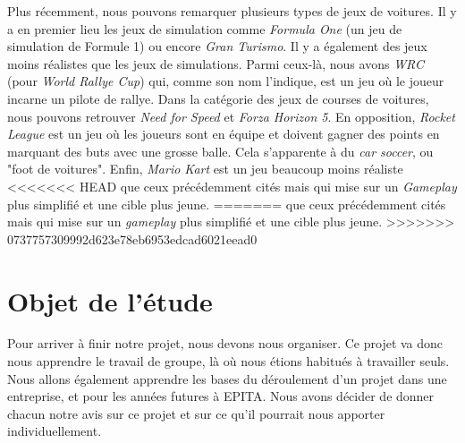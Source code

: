 \documentclass[12pt,a4paper]{article}
\begin{document}
\indent Plus récemment, nous pouvons remarquer plusieurs types de jeux de voitures. Il y a en premier lieu 
les jeux de simulation comme \textit{Formula One} (un jeu de simulation de Formule 1) ou encore 
\textit{Gran Turismo}. Il y a également des jeux moins réalistes
que les jeux de simulations. Parmi ceux-là, nous avons \textit{WRC} (pour \textit{World Rallye Cup})
qui, comme son nom l'indique, est un jeu où le joueur incarne un pilote de rallye. Dans la 
catégorie des jeux de courses de voitures, nous pouvons retrouver 
\textit{Need for Speed} et \textit{Forza Horizon 5}.
En opposition, \textit{Rocket League} est un jeu où les joueurs sont en équipe  et doivent gagner des
points en marquant des buts avec une grosse balle. Cela s'apparente à du \textit{car soccer}, ou "foot
de voitures".
Enfin, \textit{Mario Kart} est un jeu beaucoup moins réaliste
<<<<<<< HEAD
que ceux précédemment cités mais qui mise sur un \textit{Gameplay} plus simplifié et une cible plus jeune. 
=======
que ceux précédemment cités mais qui mise sur un \textit{gameplay} plus simplifié et une cible plus jeune. 
>>>>>>> 0737757309992d623e78eb6953edcad6021eead0
\clearpage

\section{Objet de l'étude}
Pour arriver à finir notre projet, nous devons nous organiser.
Ce projet va donc nous apprendre le travail de groupe, là où nous étions habitués à travailler seuls. 
Nous allons également apprendre les bases du déroulement d'un projet dans une entreprise, 
et pour les années futures à EPITA. Nous avons décider de donner chacun notre avis sur ce projet et sur ce 
qu'il pourrait nous apporter individuellement.\\
\end{document}

